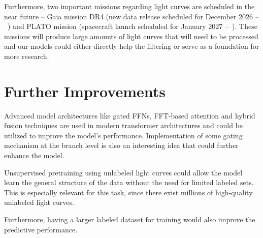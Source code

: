 Furthermore, two important missions regarding light curves are scheduled in the near future -- Gaia mission DR4 (new data release scheduled for December 2026 --~\cite{Prusti2016}) and PLATO mission (spacecraft launch scheduled for January 2027 --~\cite{Rauer2025}).
These missions will produce large amounts of light curves that will need to be processed and our models could either directly help the filtering or serve as a foundation for more research.

\section{Further Improvements}

Advanced model architectures like gated FFNs, FFT-based attention and hybrid fusion techniques are used in modern transformer architectures and could be utilized to improve the model's performance.
Implementation of some gating mechanism at the branch level is also an interesting idea that could further enhance the model.

Unsupervised pretraining using unlabeled light curves could allow the model learn the general structure of the data without the need for limited labeled sets.
This is especially relevant for this task, since there exist millions of high-quality unlabeled light curves.

Furthermore, having a larger labeled dataset for training would also improve the predictive performance.
